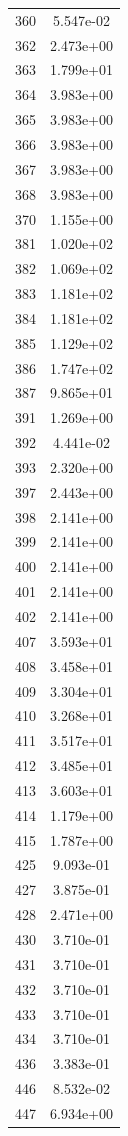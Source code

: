\documentclass[12pt]{article}
\begin{document}
\begin{longtable}{@{}cc@{}}
360 & 5.547e-02 \\
362 & 2.473e+00 \\
363 & 1.799e+01 \\
364 & 3.983e+00 \\
365 & 3.983e+00 \\
366 & 3.983e+00 \\
367 & 3.983e+00 \\
368 & 3.983e+00 \\
370 & 1.155e+00 \\
381 & 1.020e+02 \\
382 & 1.069e+02 \\
383 & 1.181e+02 \\
384 & 1.181e+02 \\
385 & 1.129e+02 \\
386 & 1.747e+02 \\
387 & 9.865e+01 \\
391 & 1.269e+00 \\
392 & 4.441e-02 \\
393 & 2.320e+00 \\
397 & 2.443e+00 \\
398 & 2.141e+00 \\
399 & 2.141e+00 \\
400 & 2.141e+00 \\
401 & 2.141e+00 \\
402 & 2.141e+00 \\
407 & 3.593e+01 \\
408 & 3.458e+01 \\
409 & 3.304e+01 \\
410 & 3.268e+01 \\
411 & 3.517e+01 \\
412 & 3.485e+01 \\
413 & 3.603e+01 \\
414 & 1.179e+00 \\
415 & 1.787e+00 \\
425 & 9.093e-01 \\
427 & 3.875e-01 \\
428 & 2.471e+00 \\
430 & 3.710e-01 \\
431 & 3.710e-01 \\
432 & 3.710e-01 \\
433 & 3.710e-01 \\
434 & 3.710e-01 \\
436 & 3.383e-01 \\
446 & 8.532e-02 \\
447 & 6.934e+00 \\

\end{longtable}
\end{document}
